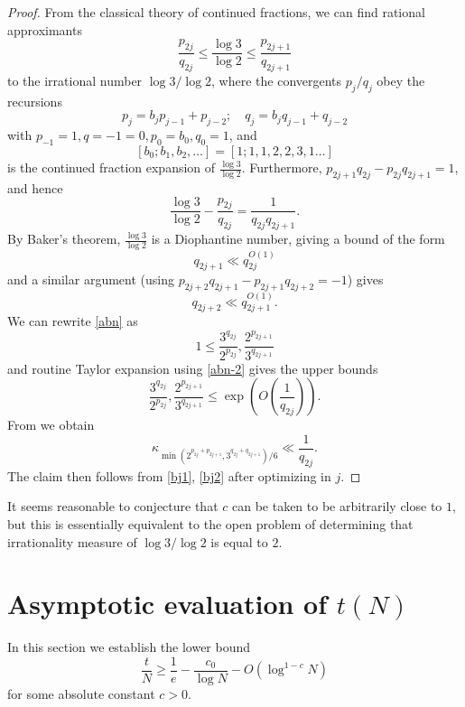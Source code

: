 \documentclass[12pt,a4paper,reqno]{amsart}
\numberwithin{equation}{section}
\theoremstyle{plain}
\theoremstyle{definition}
\begin{document}
\begin{proof}  From the classical theory of continued fractions, we can find rational approximants
\begin{equation}\label{abn}
 \frac{p_{2j}}{q_{2j}} \leq \frac{\log 3}{\log 2} \leq \frac{p_{2j+1}}{q_{2j+1}}
\end{equation}
to the irrational number $\log 3/\log 2$, where the convergents $p_j/q_j$ obey the recursions
$$ p_j = b_j p_{j-1} + p_{j-2}; \quad q_j = b_j q_{j-1} + q_{j-2}$$
with $p_{-1} = 1, q={-1}=0, p_0 = b_0, q_0=1$, and 
$$[b_0;b_1,b_2,\dots] = [1;1,1,2,2,3,1\dots]$$ 
is the continued fraction expansion of $\frac{\log 3}{\log 2}$.  Furthermore, $p_{2j+1}q_{2j} - p_{2j} q_{2j+1} = 1$, and hence
\begin{equation}\label{abn-2} 
  \frac{\log 3}{\log 2} - \frac{p_{2j}}{q_{2j}} = \frac{1}{q_{2j} q_{2j+1}}.
\end{equation}
By Baker's theorem, $\frac{\log 3}{\log 2}$ is a Diophantine number, giving a bound of the form
\begin{equation}\label{bj1}
   q_{2j+1} \ll q_{2j}^{O(1)}
\end{equation}
and a similar argument (using $p_{2j+2} q_{2j+1}-p_{2j+1} q_{2j+2} = -1$) gives
\begin{equation}\label{bj2}
 q_{2j+2} \ll q_{2j+1}^{O(1)}.
\end{equation}
We can rewrite \eqref{abn} as
$$ 1 \leq \frac{3^{q_{2j}}}{2^{p_{2j}}}, \frac{2^{p_{2j+1}}}{3^{q_{2j+1}}}$$
and routine Taylor expansion using \eqref{abn-2} gives the upper bounds
$$ \frac{3^{q_{2j}}}{2^{p_{2j}}}, \frac{2^{p_{2j+1}}}{3^{q_{2j+1}}}\leq \exp\left( O\left( \frac{1}{q_{2j}}\right)\right).$$
From  we obtain
$$
\kappa_{\min(2^{p_{2j} + p_{2j+1}}, 3^{q_{2j}+q_{2j+1}})/6} \ll \frac{1}{q_{2j}}.$$
The claim then follows from \eqref{bj1}, \eqref{bj2} after optimizing in $j$.

\end{proof}


It seems reasonable to conjecture that $c$ can be taken to be arbitrarily close to $1$, but this is essentially equivalent to the open problem of determining that irrationality measure of $\log 3 / \log 2$ is equal to $2$.


\section{Asymptotic evaluation of $t(N)$}

In this section we establish the lower bound
$$ \frac{t}{N} \geq \frac{1}{e} - \frac{c_0}{\log N} - O(\log^{1-c} N)$$
for some absolute constant $c>0$.
\end{document}
